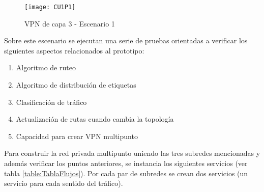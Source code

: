 \begin{figure}[ht!] 
\centering    
\texttt{[image: CU1P1]}
\caption[VPN de capa 3 - Escenario 1]{VPN de capa 3 - Escenario 1}
\label{fig:CUP1}
\end{figure}

Sobre este escenario se ejecutan una serie de pruebas orientadas a verificar los siguientes aspectos relacionados al prototipo:

\begin{enumerate}
\item Algoritmo de ruteo
\item Algoritmo de distribución de etiquetas
\item Clasificaci\'on de tr\'afico
\item Actualizaci\'on de rutas cuando cambia la topolog\'ia
\item Capacidad para crear VPN multipunto
\end{enumerate}

Para construir la red privada multipunto uniendo las tres subredes mencionadas y adem\'as verificar los puntos anteriores, se instancia los siguientes servicios (ver tabla \ref{table:TablaFlujos}). Por cada par de subredes se crean dos servicios (un servicio para cada sentido del tr\'afico).\\

